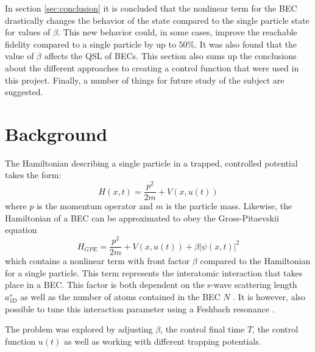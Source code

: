 \documentclass[aps,pra,reprint,superscriptaddress]{revtex4-1}
\begin{document}
In section \ref{sec:conclusion} it is concluded that the nonlinear term for the BEC drastically changes the behavior of the state compared to the single particle state for values of $\beta$. This new behavior could, in some cases, improve the reachable fidelity compared to a single particle by up to $50\%$. It was also found that the value of $\beta$ affects the QSL of BECs. This section also sums up the conclusions about the different approaches to creating a control function that were used in this project. Finally, a number of things for future study of the subject are suggested.

\section{\label{sec:back}Background}
The Hamiltonian describing a single particle in a trapped, controlled potential takes the form:
\begin{equation}
	H(x,t) = \frac{p^2}{2m} + V(x,u(t))
\end{equation}
where $p$ is the momentum operator and $m$ is the particle mass. Likewise, the Hamiltonian of a BEC can be approximated to obey the Gross-Pitaevskii equation
\begin{equation}
	H_{GPE} = \frac{p^2}{2m} + V(x,u(t)) + \beta |\psi(x,t)|^2
	\label{eq:Hbec}
\end{equation}
which contains a nonlinear term with front factor $\beta$ compared to the Hamiltonian for a single particle. This term represents the interatomic interaction that takes place in a BEC. This factor is both dependent on the s-wave scattering length $a_{\text{1D}}^s$ as well as the number of atoms contained in the BEC $N$ \cite{Schmiedmayer}. It is however, also possible to tune this interaction parameter using a Feshbach resonance \cite{Feshbach}.


The problem was explored by adjusting $\beta$, the control final time $T$, the control function $u(t)$ as well as working with different trapping potentials.
\end{document}
